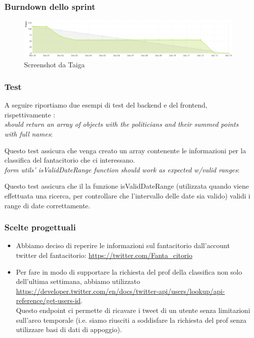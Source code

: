 \documentclass{article}
\begin{document}
\subsubsection{Burndown dello sprint}
\begin{figure}[H]
    \centering
    \includegraphics[scale=0.22]{burdowns/sprint4.png}
    \caption{Screenshot da Taiga}
    \label{fig:burndown4}
\end{figure}

\subsubsection{Test}
A seguire riportiamo due esempi di test del backend e del frontend, rispettivamente : \\
\textit{should return an array of objects with the politicians and their summed points with full names}:

Questo test assicura che venga creato un array contenente le informazioni per la classifica del fantacitorio che ci interessano. \\
\textit{form utils' isValidDateRange function should work as expected w/valid ranges}:

Questo test assicura che il la funzione isValidDateRange (utilizzata quando viene effettuata una ricerca, per controllare che l'intervallo delle date sia valido) validi i range di date correttamente.
\subsubsection{Scelte progettuali}
\begin{itemize}
    \item Abbiamo deciso di reperire le informazioni sul fantacitorio dall'account twitter del fantacitorio: \href{https://twitter.com/Fanta_citorio}{https://twitter.com/Fanta\_citorio}
    \item Per fare in modo di supportare la richiesta del prof della classifica non solo dell'ultima settimana, abbiamo utilizzato \\ \href{https://developer.twitter.com/en/docs/twitter-api/users/lookup/api-reference/get-users-id}{https://developer.twitter.com/en/docs/twitter-api/users/lookup/api-reference/get-users-id}. \\
    Questo endpoint ci permette di ricavare i tweet di un utente senza limitazioni sull'arco temporale (i.e. siamo riusciti a soddisfare la richiesta del prof senza utilizzare basi di dati di appoggio). \\
\end{itemize}
\end{document}
